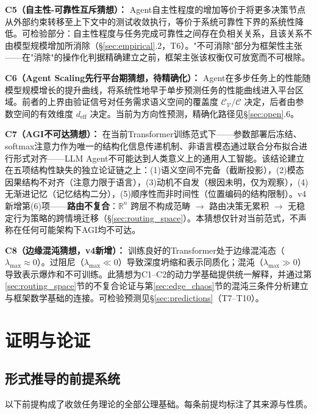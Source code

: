 \documentclass[11pt,a4paper]{article}
\theoremstyle{definition}
\newcommand{\verifspace}{\mathcal{C}_{\mathcal{V}}}
\newcommand{\taskcspace}{\mathcal{C}}
\begin{document}
\textbf{C5（自主性-可靠性互斥猜想）：}
Agent自主性程度的增加等价于将更多决策节点从外部约束转移至上下文中的测试收敛执行，等价于系统可靠性下界的系统性降低。可检验部分：自主性程度与任务完成可靠性之间存在负相关关系，且该关系不由模型规模增加所消除（\S\ref{sec:empirical}.2，T6）。"不可消除"部分为框架性主张——在"消除"的操作化判据精确建立之前，框架主张该权衡仅可放宽而不可根除。

\textbf{C6（Agent Scaling先行平台期猜想，待精确化）：}
Agent在多步任务上的性能随模型规模增长的提升曲线，将系统性地早于单步预测任务的性能曲线进入平台区域。前者的上界由验证信号对任务需求语义空间的覆盖度 $\verifspace/\taskcspace$ 决定，后者由参数空间的有效维度 $d_{\text{eff}}$ 决定。当前为方向性预测，精确化路径见\S\ref{sec:open}.6。

\textbf{C7（AGI不可达猜想）：}
在当前Transformer训练范式下——参数部署后冻结、softmax注意力作为唯一的结构化信息传递机制、非语言模态通过联合分布拟合进行形式对齐——LLM Agent不可能达到人类意义上的通用人工智能。该结论建立在五项结构性缺失的独立论证链之上：(1)语义空间不完备（截断投影），(2)模态因果结构不对齐（注意力限于语言），(3)动机不自发（根因未明，仅为观察），(4)无渐进记忆（记忆结构二分），(5)顺序性而非时间性（位置编码的结构限制）。v4新增第(6)项——\textbf{路由不复合}：$\mathbb{R}^n$ 跨层不构成范畴 $\to$ 路由决策无累积 $\to$ 无稳定行为策略的跨情境迁移（\S\ref{sec:routing_space}）。本猜想仅针对当前范式，不声称在任何可能架构下AGI均不可达。

\textbf{C8（边缘混沌猜想，v4新增）：}
训练良好的Transformer处于边缘混沌态（$\lambda_{\max} \approx 0$）。过阻尼（$\lambda_{\max} \ll 0$）导致深度坍缩和表示同质化；混沌（$\lambda_{\max} \gg 0$）导致表示爆炸和不可训练。此猜想为C1--C2的动力学基础提供统一解释，并通过第\ref{sec:routing_space}节的不复合论证与第\ref{sec:edge_chaos}节的混沌三条件分析建立与框架数学基础的连接。可检验预测见\S\ref{sec:predictions}（T7--T10）。


\section{证明与论证}
\label{sec:formal}

\subsection{形式推导的前提系统}

以下前提构成了收敛任务理论的全部公理基础。每条前提均标注了其来源与性质。
\end{document}
